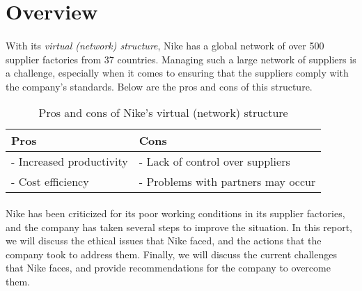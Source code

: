 \section{Overview}
\label{sec:overview}

\paragraph{} With its \textit{virtual (network) structure}, Nike has a global network of over 500 supplier factories from 37 countries. Managing such a large network of suppliers is a challenge, especially when it comes to ensuring that the suppliers comply with the company's standards. Below are the pros and cons of this structure.

\begin{table}[H]
    \centering
    \begin{tabular}{|l|l|}
        \hline
        Pros & Cons \\
        \hline
        - Increased productivity & - Lack of control over suppliers \\
        - Cost efficiency & - Problems with partners may occur \\
        \hline
    \end{tabular}
    \caption{Pros and cons of Nike's virtual (network) structure}
    \label{tab:virtual-structure}
\end{table}

\paragraph{} Nike has been criticized for its poor working conditions in its supplier factories, and the company has taken several steps to improve the situation. In this report, we will discuss the ethical issues that Nike faced, and the actions that the company took to address them. Finally, we will discuss the current challenges that Nike faces, and provide recommendations for the company to overcome them.